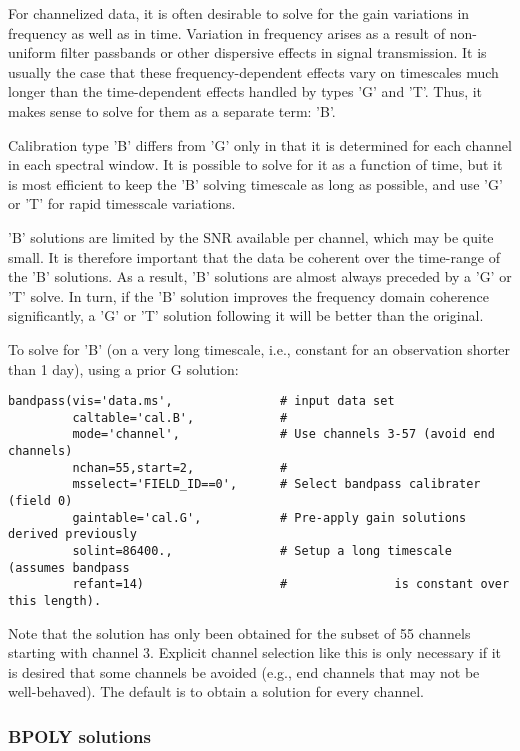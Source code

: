 For channelized data, it is often desirable to solve for the gain
variations in frequency as well as in time.  Variation in frequency
arises as a result of non-uniform filter passbands or other dispersive
effects in signal transmission.  It is usually the case that these
frequency-dependent effects vary on timescales much longer than the
time-dependent effects handled by types 'G' and 'T'.  Thus, it makes
sense to solve for them as a separate term: 'B'.

Calibration type 'B' differs from 'G' only in that it is determined
for each channel in each spectral window.  It is possible to solve
for it as a function of time, but it is most efficient to keep the
'B' solving timescale as long as possible, and use 'G' or 'T' for
rapid timesscale variations.

'B' solutions are limited by the SNR available per channel, which may
be quite small.  It is therefore important that the data be coherent
over the time-range of the 'B' solutions.  As a result, 'B' solutions
are almost always preceded by a 'G' or 'T' solve.  In turn, if the 'B'
solution improves the frequency domain coherence significantly, a 'G'
or 'T' solution following it will be better than the original.

To solve for 'B' (on a very long timescale, i.e., constant for
an observation shorter than 1 day), using a prior G solution:

\small
\begin{verbatim}
bandpass(vis='data.ms',               # input data set
         caltable='cal.B',            #
         mode='channel',              # Use channels 3-57 (avoid end channels)
         nchan=55,start=2,            #
         msselect='FIELD_ID==0',      # Select bandpass calibrater (field 0)
         gaintable='cal.G',           # Pre-apply gain solutions derived previously
         solint=86400.,               # Setup a long timescale (assumes bandpass
         refant=14)                   #               is constant over this length).
\end{verbatim}
\normalsize

Note that the solution has only been obtained for the subset of 55
channels starting with channel 3.  Explicit channel selection like
this is only necessary if it is desired that some channels be avoided
(e.g., end channels that may not be well-behaved).  The default is to
obtain a solution for every channel.

\subsubsection{BPOLY solutions}
\label{subsubsection:synth.bpoly.solns}

